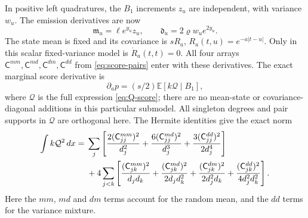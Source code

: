 \documentclass[11pt,a4paper]{amsart}
\theoremstyle{plain}
\theoremstyle{definition}
\theoremstyle{remark}
\newcommand{\EE}{\mathbb{E}}
\begin{document}
In positive left quadratures, the $B_1$ increments $z_u$ are independent,
with variance $w_u$. The emission derivatives are now
\[
 \mathfrak m_u=\ell e^{y_u}z_u,\qquad
 \mathfrak d_u=2\varrho w_ue^{2y_u}.
\]
The state mean is fixed and its covariance is $sR_a$,
$R_a(t,u)=e^{-a|t-u|}$. Only in this scalar fixed-variance model is
$\dot R_a(t,t)=0$. All four arrays
$\mathsf C^{mm},\mathsf C^{md},\mathsf C^{dm},\mathsf C^{dd}$ from
\eqref{eq:score-pairs} enter with these derivatives. The exact marginal
score derivative is
\begin{equation}\label{eq:a2-score}
 \partial_a p=(s/2)\EE[k\mathcal Q\mid B_1],
\end{equation}
where $\mathcal Q$ is the full expression \eqref{eq:Q-score}; there are
no mean-state or covariance-diagonal additions in this particular
submodel. All singleton degrees and pair supports in $\mathcal Q$ are
orthogonal here. The Hermite identities give the exact norm
\begin{align}\label{eq:a2-score-norm}
 \int k\mathcal Q^2\,dx={}&\sum_j\left[
 \frac{2(\mathsf C^{mm}_{jj})^2}{d_j^2}
 +\frac{6(\mathsf C^{md}_{jj})^2}{d_j^3}
 +\frac{3(\mathsf C^{dd}_{jj})^2}{2d_j^4}\right]\notag\\
 &+4\sum_{j<k}\left[
 \frac{(\mathsf C^{mm}_{jk})^2}{d_jd_k}
 +\frac{(\mathsf C^{md}_{jk})^2}{2d_jd_k^2}
 +\frac{(\mathsf C^{dm}_{jk})^2}{2d_j^2d_k}
 +\frac{(\mathsf C^{dd}_{jk})^2}{4d_j^2d_k^2}\right].
\end{align}
Here the $mm$, $md$ and $dm$ terms account for the random mean, and the
$dd$ terms for the variance mixture.
\end{document}
